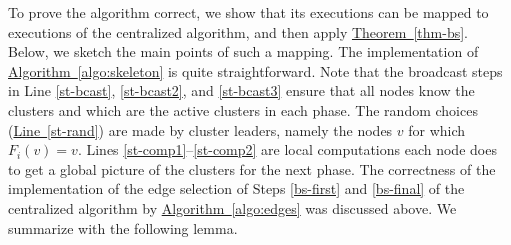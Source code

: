 \documentclass[letterpaper,11pt]{article}
\newcommand{\namedref}[2]{\hyperref[#2]{#1~\ref*{#2}}}
\newcommand{\theoremref}[1]{\namedref{Theorem}{#1}}
\newcommand{\algref}[1]{\namedref{Algorithm}{#1}}
\newcommand{\lineref}[1]{\namedref{Line}{#1}}
\begin{document}
To prove the algorithm correct, we show that its executions can be mapped to
executions of the centralized algorithm, and then apply \theoremref{thm-bs}.
Below, we sketch the main points of such a mapping. The implementation of
\algref{algo:skeleton} is quite straightforward. Note that the broadcast steps
in Line \ref{st-bcast}, \ref{st-bcast2}, and \ref{st-bcast3} ensure that all
nodes know the clusters and which are the active clusters in each phase. The
random choices (\lineref{st-rand}) are made by cluster leaders, namely the nodes
$v$ for which $F_i(v)=v$. Lines \ref{st-comp1}--\ref{st-comp2} are local
computations each node does to get a global picture of the clusters
for the next phase. The correctness of the implementation of the edge selection
of Steps \ref{bs-first} and \ref{bs-final} of the centralized algorithm by 
\algref{algo:edges} was discussed above. We summarize with the following lemma.
\end{document}

